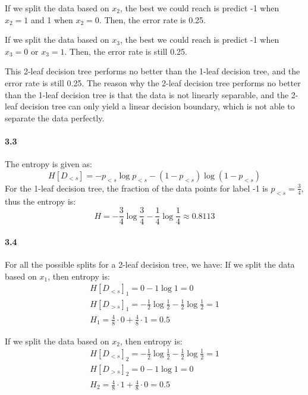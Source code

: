 \documentclass[11pt]{article}
\begin{document}
If we split the data based on $x_2$, the best we could reach is predict -1 when $x_2=1$ and 1 when $x_2=0$. Then, the error rate is 0.25.

If we split the data based on $x_3$, the best we could reach is predict -1 when $x_3=0$ or $x_3=1$. Then, the error rate is still 0.25.

This 2-leaf decision tree performs no better than the 1-leaf decision tree, and the error rate is still 0.25. The reason why the 2-leaf decision tree performs no better than the 1-leaf decision tree is that the data is not linearly separable, and the 2-leaf decision tree can only yield a linear decision boundary, which is not able to separate the data perfectly.
\paragraph{3.3}
The entropy is given as:
\begin{equation}
    H[D_{<s}] = -p_{<s}\log p_{<s} - (1-p_{<s})\log(1-p_{<s})
\end{equation}
For the 1-leaf decision tree, the fraction of the data points for label -1 is $p_{<s} = \frac{3}{4}$, thus the entropy is:
\begin{equation}
    H = -\frac{3}{4}\log \frac{3}{4} - \frac{1}{4}\log \frac{1}{4} \approx 0.8113
\end{equation} 
\paragraph{3.4}
For all the possible splits for a 2-leaf decision tree, we have:
If we split the data based on $x_1$, then entropy is:
\begin{equation}
    \begin{split}
        H[D_{<s}]_1 = 0 - 1\log 1 = 0 \\ 
        H[D_{>s}]_1 = -\frac{1}{2}\log \frac{1}{2} - \frac{1}{2}\log \frac{1}{2} = 1 \\
        H_1 = \frac{4}{8} \cdot 0 + \frac{4}{8} \cdot 1 = 0.5
    \end{split}
\end{equation}

If we split the data based on $x_2$, then entropy is:
\begin{equation}
    \begin{split}
        H[D_{<s}]_2 = -\frac{1}{2}\log \frac{1}{2} - \frac{1}{2}\log \frac{1}{2} = 1 \\ 
        H[D_{>s}]_2 = 0 - 1\log 1 = 0 \\
        H_2 = \frac{4}{8} \cdot 1 + \frac{4}{8} \cdot 0 = 0.5
    \end{split}
\end{equation}
\end{document}
